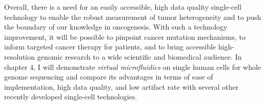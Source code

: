 Overall, there is a need for an easily accessible, high data quality single-cell technology to enable the robust measurement of tumor heterogeneity and to push the boundary of our knowledge in oncogenesis. With such a technology improvement, it will be possible to pinpoint cancer mutation mechanisms, to inform targeted cancer therapy for patients, and to bring accessible high-resolution genomic research to a wide scientific and biomedical audience. In chapter 4, I will demonstrate \textit{virtual microfluidics} on single human cells for whole genome sequencing and compare its advantages in terms of ease of implementation, high data quality, and low artifact rate with several other recently developed single-cell technologies. 

